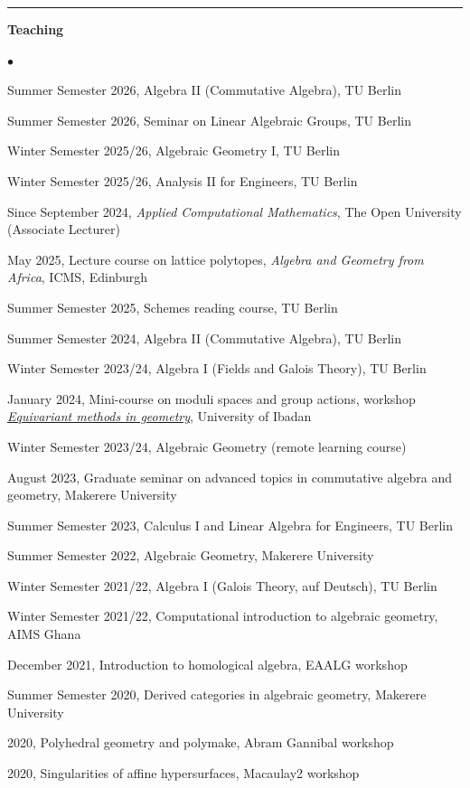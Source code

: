 \documentclass[10pt]{article}
\newcommand{\cvsection}[1]{%
  \par\vspace{0.24cm}%
  \noindent\rule{\textwidth}{0.4pt}%
  \par\vspace{0.12cm}%
  \noindent\textbf{\large #1}%
  \par\vspace{0.12cm}%
}
\newenvironment{cvlist}%
  {\begin{list}{$\bullet$}{%
     \setlength{\leftmargin}{1.1em}\setlength{\labelwidth}{0.8em}%
     \setlength{\itemsep}{0.12cm}\setlength{\parsep}{0pt}%
     \setlength{\topsep}{0pt}\setlength{\partopsep}{0pt}}}%
  {\end{list}}
\begin{document}
\cvsection{Teaching}
\begin{cvlist}
\item Summer Semester 2026, Algebra II (Commutative Algebra), TU Berlin
\item Summer Semester 2026, Seminar on Linear Algebraic Groups, TU Berlin
\item Winter Semester 2025/26, Algebraic Geometry I, TU Berlin
\item Winter Semester 2025/26, Analysis II for Engineers, TU Berlin
\item Since September 2024, {\em Applied Computational Mathematics},
The Open University (Associate Lecturer)
\item May 2025, Lecture course on lattice polytopes,
{\em Algebra and Geometry from Africa}, ICMS, Edinburgh
\item Summer Semester 2025, Schemes reading course, TU Berlin
\item Summer Semester 2024, Algebra II (Commutative Algebra), TU Berlin
\item Winter Semester 2023/24, Algebra I (Fields and Galois Theory), TU Berlin
\item January 2024, Mini-course on moduli spaces and group actions, workshop
\href{https://sites.google.com/view/bunnett/equivariant-methods-in-geometry-ibadan-2023}{\em Equivariant methods in geometry},
University of Ibadan
\item Winter Semester 2023/24, Algebraic Geometry (remote learning course)
\item August 2023, Graduate seminar on advanced topics in commutative algebra
and geometry, Makerere University
\item Summer Semester 2023, Calculus I and Linear Algebra for Engineers, TU Berlin
\item Summer Semester 2022, Algebraic Geometry, Makerere University
\item Winter Semester 2021/22, Algebra I (Galois Theory, auf Deutsch), TU Berlin
\item Winter Semester 2021/22, Computational introduction to algebraic geometry, AIMS Ghana
\item December 2021, Introduction to homological algebra, EAALG workshop
\item Summer Semester 2020, Derived categories in algebraic geometry, Makerere University
\item 2020, Polyhedral geometry and polymake, Abram Gannibal workshop
\item 2020, Singularities of affine hypersurfaces, Macaulay2 workshop

\end{cvlist}
\end{document}

